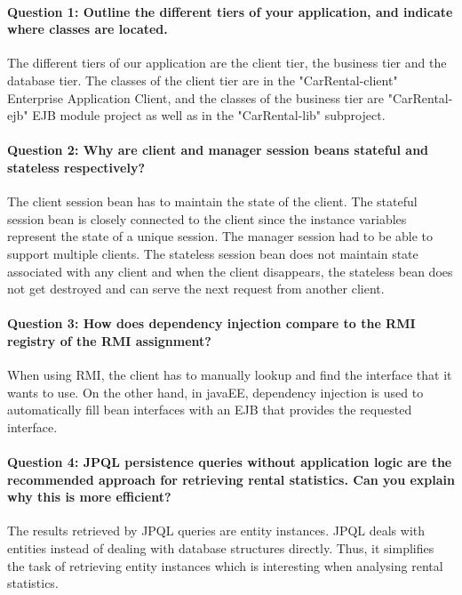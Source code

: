 \documentclass{ds-report}
\begin{document}
	\maketitle

	\paragraph{Question 1: Outline the different tiers of your application, and indicate where classes are located.\\} 
	The different tiers of our application are the client tier, the business tier and the database tier. 
	The classes of the client tier are in the "CarRental-client" Enterprise Application Client, and the classes of the business tier are "CarRental-ejb" EJB module project as well as in the "CarRental-lib" 
	subproject.
	
	\paragraph{Question 2: Why are client and manager session beans stateful and stateless respectively?\\} 
	The client session bean has to maintain the state of the client. The stateful session bean is closely connected to the client since the instance variables represent the state of a unique session. 
	The manager session had to be able to support multiple clients. 
	The stateless session bean does not maintain state associated with any client and when the client disappears, the stateless bean does not get destroyed and can serve the next request from another client.
	\paragraph{Question 3: How does dependency injection compare to the RMI registry of the RMI assignment?\\} 
	When using RMI, the client has to manually lookup and find the interface that it wants to use. On the 
	other hand, in javaEE, dependency injection is used to automatically fill bean interfaces with an EJB 
	that provides the requested interface.
	
	\paragraph{Question 4: JPQL persistence queries without application logic are the recommended approach for retrieving rental statistics. Can you explain why this is more efficient?\\} 
	The results retrieved by JPQL queries are entity instances. JPQL deals with entities instead of dealing with database structures directly. Thus, it simplifies the task of retrieving entity instances which is interesting when analysing rental statistics.
	
\end{document}
